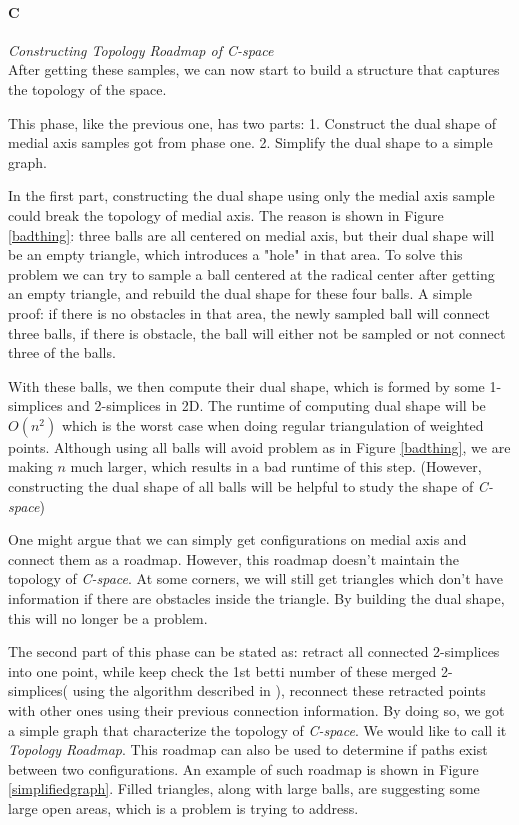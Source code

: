 \documentclass[11pt]{article}
\begin{document}

\paragraph{C} \emph{Constructing Topology Roadmap of C-space} \hfill \\
\indent After getting these samples, we can now start to build a structure that captures the topology of the space. 

\indent This phase, like the previous one, has two parts: 1. Construct the dual shape of medial axis samples got from phase one. 2. Simplify the dual shape to a simple graph.

\indent In the first part, constructing the dual shape using only the medial axis sample could break the topology of medial axis. The reason is shown in Figure \ref{badthing}: three balls are all centered on medial axis, but their dual shape will be an empty triangle, which introduces a "hole" in that area. To solve this problem we can try to sample a ball centered at the radical center after getting an empty triangle, and rebuild the dual shape for these four balls\cite{radical center}. A simple proof: if there is no obstacles in that area, the newly sampled ball will connect three balls, if there is obstacle, the ball will either not be sampled or not connect three of the balls.

\indent With these balls, we then compute their dual shape, which is formed by some 1-simplices and 2-simplices in 2D. The runtime of computing dual shape will be $O(n^2)$ which is the worst case when doing regular triangulation of weighted points. Although using all balls will avoid problem as in Figure \ref{badthing}, we are making $n$ much larger, which results in a bad runtime of this step. (However, constructing the dual shape of all balls will be helpful to study the shape of \emph{C-space})

\indent One might argue that we can simply get configurations on medial axis and connect them as a roadmap. However, this roadmap doesn't maintain the topology of \emph{C-space}. At some corners, we will still get triangles which don't have information if there are obstacles inside the triangle. By building the dual shape, this will no longer be a problem. 

\indent The second part of this phase can be stated as: retract all connected 2-simplices into one point, while keep check the 1st betti number of these merged 2-simplices( using the algorithm described in \cite{incre_betti} ), reconnect these retracted points with other ones using their previous connection information. By doing so, we got a simple graph that characterize the topology of \emph{C-space}. We would like to call it \emph{Topology Roadmap}. This roadmap can also be used to determine if paths exist between two configurations. An example of such roadmap is shown in Figure \ref{simplifiedgraph}. Filled triangles, along with large balls, are suggesting some large open areas, which is a problem \cite{largeconvex} is trying to address. 
\end{document}
